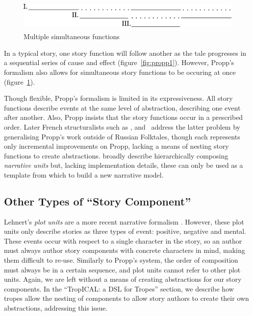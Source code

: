 \begin{figure}[!t]
\centerline{\includegraphics[height=0.6in]{propp2.png}}
\caption{Multiple simultaneous functions}\label{fig:propp2}
\end{figure}

In a typical story, one story function will follow another as the tale progresses in a sequential series of cause and effect (figure~\ref{fig:propp1}). However, Propp's formalism also allows for simultaneous story functions to be occuring at once (figure~\ref{fig:propp2}).

Though flexible, Propp's formalism is limited in its expressiveness. All story functions describe events at the same level of abstraction, describing one event after another. Also, Propp insists that the story functions occur in a prescribed order. Later French structuralists such as \citep{bremond1980logic}, \citep{greimas1983structural} and~\citep{todorov1969grammaire} address the latter problem by generalising Propp's work outside of Russian Folktales, though each represents only incremental improvements on Propp, lacking a means of nesting story functions to create abstractions. \citep{barthes1975introduction} broadly describe hierarchically composing \emph{narrative units} but, lacking implementation details, these can only be used as a template from which to build a new narrative model.


\subsection{Other Types of ``Story Component''}
Lehnert's \emph{plot units} are a more recent narrative formalism \cite{lehnert1981plot}. However, these plot units only describe stories as three types of event: positive, negative and mental. These events occur with respect to a single character in the story, so an author must always author story components with concrete characters in mind, making them difficult to re-use. Similarly to Propp's system, the order of composition must always be in a certain sequence, and plot units cannot refer to other plot units. Again, we are left without a means of creating abstractions for our story components. In the ``TropICAL: a DSL for Tropes'' section, we describe how tropes allow the nesting of components to allow story authors to create their own abstractions, addressing this issue.

